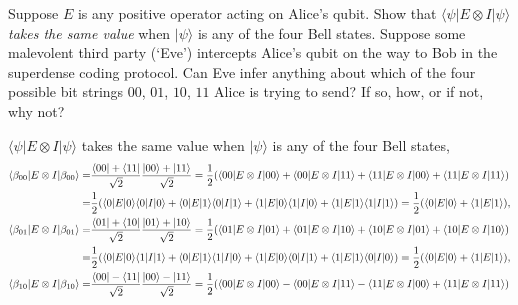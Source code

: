 \documentclass[en]{sol-man}
\begin{document}
\begin{exe}
    Suppose $E$ is any positive operator acting on Alice's qubit. Show that $\langle\psi\rvert E\otimes I\lvert\psi\rangle$ \emph{takes the same value} when $\lvert\psi\rangle$ is any of the four Bell states. Suppose some malevolent third party (`Eve') intercepts Alice's qubit on the way to Bob in the superdense coding protocol. Can Eve infer anything about which of the four possible bit strings $00$, $01$, $10$, $11$ Alice is trying to send? If so, how, or if not, why not?
\end{exe}
\begin{pf}
    $\langle\psi\rvert E\otimes I\lvert\psi\rangle$ takes the same value when $\lvert\psi\rangle$ is any of the four Bell states,
    \begin{align}
        \notag\langle\beta_{00}\rvert E\otimes I\lvert\beta_{00}\rangle=&\frac{\langle 00\rvert+\langle 11\rvert}{\sqrt{2}}\frac{\lvert 00\rangle+\lvert 11\rangle}{\sqrt{2}}=\frac{1}{2}(\langle 00\rvert E\otimes I\lvert 00\rangle+\langle 00\rvert E\otimes I\lvert 11\rangle+\langle 11\rvert E\otimes I\lvert 00\rangle+\langle 11\rvert E\otimes I\lvert 11\rangle)\\
        =&\frac{1}{2}(\langle 0\rvert E\lvert 0\rangle\langle 0\rvert I\lvert 0\rangle+\langle 0\rvert E\lvert 1\rangle\langle 0\rvert I\lvert 1\rangle+\langle 1\rvert E\lvert 0\rangle\langle 1\rvert I\lvert 0\rangle+\langle 1\rvert E\lvert 1\rangle\langle 1\rvert I\lvert 1\rangle)=\frac{1}{2}(\langle 0\rvert E\lvert 0\rangle+\langle 1\rvert E\lvert 1\rangle),\\
        \notag\langle\beta_{01}\rvert E\otimes I\lvert\beta_{01}\rangle=&\frac{\langle 01\rvert+\langle 10\rvert}{\sqrt{2}}\frac{\lvert 01\rangle+\lvert 10\rangle}{\sqrt{2}}=\frac{1}{2}(\langle 01\rvert E\otimes I\lvert 01\rangle+\langle 01\rvert E\otimes I\lvert 10\rangle+\langle 10\rvert E\otimes I\lvert 01\rangle+\langle 10\rvert E\otimes I\lvert 10\rangle)\\
        =&\frac{1}{2}(\langle 0\rvert E\lvert 0\rangle\langle 1\rvert I\lvert 1\rangle+\langle 0\rvert E\lvert 1\rangle\langle 1\rvert I\lvert 0\rangle+\langle 1\rvert E\lvert 0\rangle\langle 0\rvert I\lvert 1\rangle+\langle 1\rvert E\lvert 1\rangle\langle 0\rvert I\lvert 0\rangle)=\frac{1}{2}(\langle 0\rvert E\lvert 0\rangle+\langle 1\rvert E\lvert 1\rangle),\\
        \notag\langle\beta_{10}\rvert E\otimes I\lvert\beta_{10}\rangle=&\frac{\langle 00\rvert-\langle 11\rvert}{\sqrt{2}}\frac{\lvert 00\rangle-\lvert 11\rangle}{\sqrt{2}}=\frac{1}{2}(\langle 00\rvert E\otimes I\lvert 00\rangle-\langle 00\rvert E\otimes I\lvert 11\rangle-\langle 11\rvert E\otimes I\lvert 00\rangle+\langle 11\rvert E\otimes I\lvert 11\rangle)\\

\end{align}
\end{pf}
\end{document}
